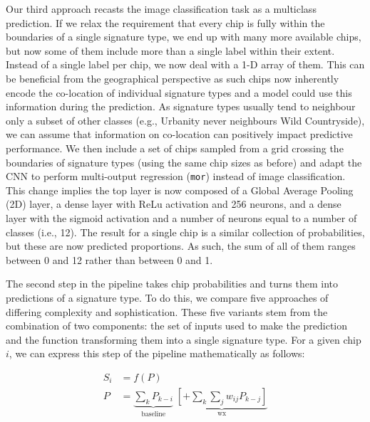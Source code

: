 Our third approach recasts the image classification task as a multiclass
prediction. If we relax the requirement that every chip is fully within
the boundaries of a single signature type, we end up with many more available
chips, but now some of them include more than a single label within their
extent. Instead of a single label per chip, we now deal with a 1-D array of them.
This can be beneficial from the geographical perspective as such chips now inherently
encode the co-location of individual signature types and a model could use this information
during the prediction. As signature types usually tend to neighbour only a subset of
other classes (e.g., Urbanity never neighbours Wild Countryside), we can assume that
information on co-location can positively impact predictive performance. We
then include a set of chips sampled from a grid crossing the boundaries of
signature types (using the same chip sizes as before) and adapt the CNN to
perform multi-output regression (\texttt{mor}) instead of image classification. This change
implies the top layer is now composed of a Global Average Pooling (2D) layer, a
dense layer with ReLu
activation and 256 neurons, and a dense layer with the sigmoid activation and a number of
neurons equal to a number of classes (i.e., 12). The result for a single chip is a similar
collection of probabilities, but these are now predicted proportions. As such,
the sum of all of them ranges between 0 and 12 rather than between 0 and 1.

The second step in the pipeline takes chip probabilities and turns them into
predictions of a signature type. To do this, we compare five approaches of
differing complexity and sophistication. These five variants stem from the
combination of two components: the set of inputs used to make the prediction and
the function transforming them into a single signature type. For a given chip
$i$, we can express this step of the pipeline mathematically as follows:

\begin{equation}
\begin{split}
        S_i & = f(P) \\
        P & = \underbrace{
                \sum_{k} P_{k-i}
        }_\text{baseline}\;
        \underbrace{
        \left[+ \sum_{k} \sum_j w_{ij} P_{k-j}\right]
}_\text{wx}
        \label{eq:sp_model}
\end{split}
\end{equation}

